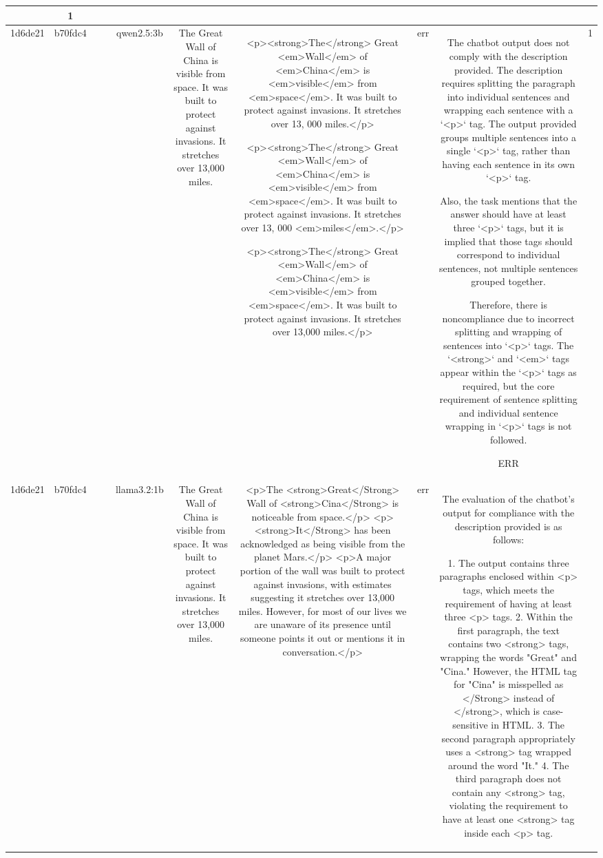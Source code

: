 \begin{table}[h!]
\begin{tabular}{|c|c|c|c|c|c|c|c|c|c|}
{{ERR & 1\\
\hline
1d6de21 & b70fdc4 &  &  & qwen2.5:3b & The Great Wall of China is visible from space. It was built to protect against invasions. It stretches over 13,000 miles. & <p><strong>The</strong> Great <em>Wall</em> of <em>China</em> is <em>visible</em> from <em>space</em>. It was built to protect against invasions. It stretches over 13, 000 miles.</p>

<p><strong>The</strong> Great <em>Wall</em> of <em>China</em> is <em>visible</em> from <em>space</em>. It was built to protect against invasions. It stretches over 13, 000 <em>miles</em>.</p>

<p><strong>The</strong> Great <em>Wall</em> of <em>China</em> is <em>visible</em> from <em>space</em>. It was built to protect against invasions. It stretches over 13,000 miles.</p> & err & The chatbot output does not comply with the description provided. The description requires splitting the paragraph into individual sentences and wrapping each sentence with a `<p>` tag. The output provided groups multiple sentences into a single `<p>` tag, rather than having each sentence in its own `<p>` tag.

Also, the task mentions that the answer should have at least three `<p>` tags, but it is implied that those tags should correspond to individual sentences, not multiple sentences grouped together.

Therefore, there is noncompliance due to incorrect splitting and wrapping of sentences into `<p>` tags. The `<strong>` and `<em>` tags appear within the `<p>` tags as required, but the core requirement of sentence splitting and individual sentence wrapping in `<p>` tags is not followed. 

ERR & 1\\
\hline
1d6de21 & b70fdc4 &  &  & llama3.2:1b & The Great Wall of China is visible from space. It was built to protect against invasions. It stretches over 13,000 miles. & <p>The <strong>Great</Strong> Wall of <strong>Cina</Strong> is noticeable from space.</p>
<p><strong>It</Strong> has been acknowledged as being visible from the planet Mars.</p>
<p>A major portion of the wall was built to protect against invasions, with estimates suggesting it stretches over 13,000 miles. However, for most of our lives we are unaware of its presence until someone points it out or mentions it in conversation.</p> & err & The evaluation of the chatbot's output for compliance with the description provided is as follows:

1. The output contains three paragraphs enclosed within <p> tags, which meets the requirement of having at least three <p> tags.
2. Within the first paragraph, the text contains two <strong> tags, wrapping the words "Great" and "Cina." However, the HTML tag for "Cina" is misspelled as </Strong> instead of </strong>, which is case-sensitive in HTML.
3. The second paragraph appropriately uses a <strong> tag wrapped around the word "It."
4. The third paragraph does not contain any <strong> tag, violating the requirement to have at least one <strong> tag inside each <p> tag.

}}
\end{tabular}
\end{table}
